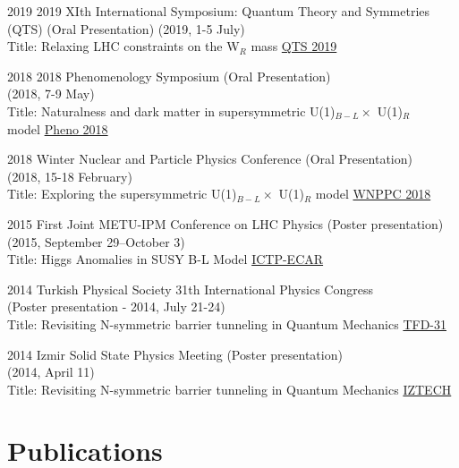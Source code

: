 \documentclass[]{friggeri-cv}
\begin{document}
\begin{entrylist}

	\entry
	{2019}
	{2019 XIth International Symposium: Quantum Theory and Symmetries (QTS)  \normalfont (Oral Presentation) (2019, 1-5 July) \\
	Title: Relaxing LHC constraints on the W$_R$ mass}
	{\href{http://www.crm.umontreal.ca/2019/QTS2019/pdf/ozdal.pdf}{QTS 2019}} 
		
	\entry
	{2018}
	{2018 Phenomenology Symposium  \normalfont (Oral Presentation) \\ (2018, 7-9 May) \\
		Title: Naturalness and dark matter in supersymmetric U(1)$_{B-L} \times$ U(1)$_R$ \\ model}
	{\href{https://indico.cern.ch/event/699148/}{Pheno 2018}} 
	
	\entry
	{2018}
	{Winter Nuclear and Particle Physics Conference  \normalfont (Oral Presentation) \\ (2018, 15-18 February) \\
	Title: Exploring the supersymmetric U(1)$_{B-L} \times$ U(1)$_R$ model}
	{\href{http://wnppc.triumf.ca/2018/}{WNPPC 2018}}
	
	\entry
	{2015}
	{First Joint METU-IPM Conference on LHC Physics  \normalfont (Poster presentation) \\ (2015, September 29--October 3) \\
	Title: Higgs Anomalies in SUSY B-L Model}
	{\href{http://ictp-ecar.org/events/first-joint-metu-ipm-conference-on-lhc-physics/}{ICTP-ECAR}}
	
	\entry
	{2014}
	{Turkish Physical Society 31th International Physics Congress \\ \normalfont (Poster presentation - 2014, July 21-24) \\
	Title: Revisiting N-symmetric barrier tunneling in Quantum Mechanics}
	{\href{http://www.tfd.com.tr/arsiv/TFD/31/en/default.htm}{TFD-31}}

	\entry
	{2014}
	{Izmir Solid State Physics Meeting  \normalfont (Poster presentation) \\ (2014, April 11) \\
		Title: Revisiting N-symmetric barrier tunneling in Quantum Mechanics}
	{\href{http://ymf.iyte.edu.tr/?page_id=234}{IZTECH}}
	

\end{entrylist}


\newpage

\section{Publications}
\end{document}

